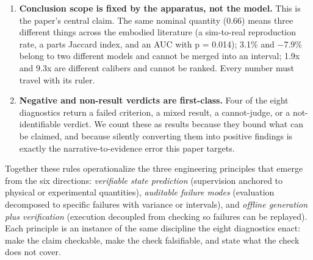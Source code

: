 \begin{enumerate}
  \item \textbf{Conclusion scope is fixed by the apparatus, not the model.}
  This is the paper's central claim. The same nominal quantity (0.66) means
  three different things across the embodied literature (a sim-to-real
  reproduction rate, a parts Jaccard index, and an AUC with p = 0.014); 3.1\% and
  $-$7.9\% belong to two different models and cannot be merged into an interval;
  1.9x and 9.3x are different calibers and cannot be ranked. Every number must
  travel with its ruler.

  \item \textbf{Negative and non-result verdicts are first-class.} Four of the
  eight diagnostics return a failed criterion, a mixed result, a cannot-judge,
  or a not-identifiable verdict. We count these as results because they bound
  what can be claimed, and because silently converting them into positive
  findings is exactly the narrative-to-evidence error this paper targets.
\end{enumerate}

Together these rules operationalize the three engineering principles that emerge
from the six directions: \emph{verifiable state prediction} (supervision anchored
to physical or experimental quantities), \emph{auditable failure modes}
(evaluation decomposed to specific failures with variance or intervals), and
\emph{offline generation plus verification} (execution decoupled from checking so
failures can be replayed). Each principle is an instance of the same discipline
the eight diagnostics enact: make the claim checkable, make the check falsifiable,
and state what the check does not cover.